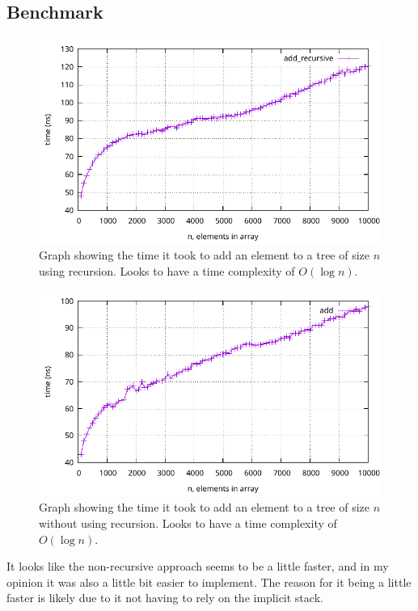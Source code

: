\documentclass[a4paper, 11pt]{article}
\begin{document}
\subsection{Benchmark}
	\begin{figure}[H]
		\centering
		\includegraphics[scale=0.8]{graphs/add_recursive.pdf}
		\caption{
			Graph showing the time it took to add an element to a tree of size \(n\) using recursion.
			Looks to have a time complexity of \(O(\log n)\).
		}
	\end{figure}
	\begin{figure}[H]
		\centering
		\includegraphics[scale=0.8]{graphs/add.pdf}
		\caption{
			Graph showing the time it took to add an element to a tree of size \(n\) without using recursion.
			Looks to have a time complexity of \(O(\log n)\).
		}
	\end{figure}
	It looks like the non-recursive approach seems to be a little faster,
	and in my opinion it was also a little bit easier to implement.
	The reason for it being a little faster is likely due to it not having to rely on the implicit stack.
\end{document}
